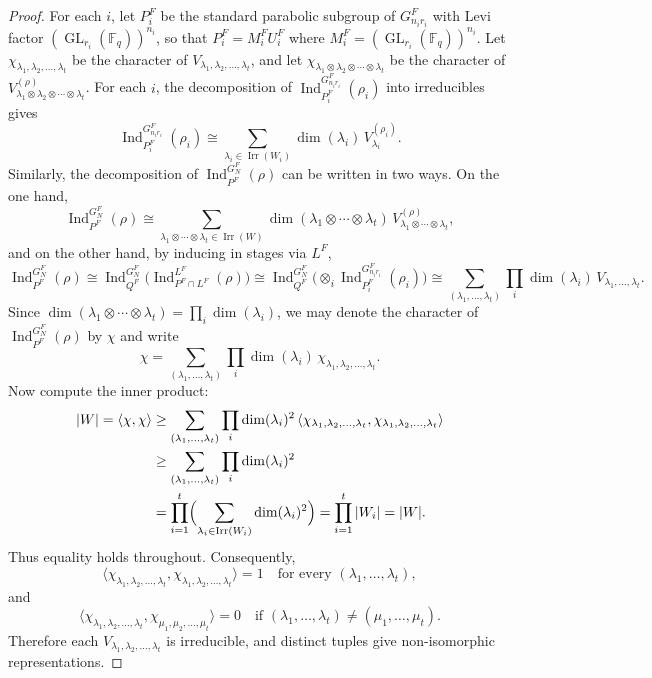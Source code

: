 \documentclass[12pt]{article}
\theoremstyle{remark}
\begin{document}
\begin{proof}
For each $i$, let $P_i^F$ be the standard parabolic subgroup of $G_{n_i r_i}^F$ with Levi factor $(\operatorname{GL}_{r_i}(\mathbb{F}_q))^{n_i}$, so that $P_i^F = M_i^F U_i^F$ where $M_i^F = (\operatorname{GL}_{r_i}(\mathbb{F}_q))^{n_i}$. Let $\chi_{\lambda_1,\lambda_2,\dots,\lambda_t}$ be the character of $V_{\lambda_1,\lambda_2,\dots,\lambda_t}$, and let $\chi_{\lambda_1 \otimes \lambda_2 \otimes \cdots \otimes \lambda_t}$ be the character of $V^{(\rho)}_{\lambda_1 \otimes \lambda_2 \otimes \cdots \otimes \lambda_t}$.
For each $i$, the decomposition of $\operatorname{Ind}_{P_i^F}^{G_{n_i r_i}^F}(\rho_i)$ into irreducibles gives
$$
\operatorname{Ind}_{P_i^F}^{G_{n_i r_i}^F}(\rho_i) \cong \sum_{\lambda_i \in \operatorname{Irr}(W_i)} \dim(\lambda_i) \, V_{\lambda_i}^{(\rho_i)}.
$$
Similarly, the decomposition of $\operatorname{Ind}_{P^F}^{G_N^F}(\rho)$ can be written in two ways. On the one hand,
$$
\operatorname{Ind}_{P^F}^{G_N^F}(\rho) \cong \sum_{\lambda_1 \otimes \cdots \otimes \lambda_t \in \operatorname{Irr}(W)} \dim(\lambda_1 \otimes \cdots \otimes \lambda_t) \, V^{(\rho)}_{\lambda_1 \otimes \cdots \otimes \lambda_t},
$$
and on the other hand, by inducing in stages via $L^F$,
$$
\operatorname{Ind}_{P^F}^{G_N^F}(\rho)
\cong \operatorname{Ind}_{Q^F}^{G_N^F}\bigl( \operatorname{Ind}_{P^F \cap L^F}^{L^F}(\rho) \bigr)
\cong \operatorname{Ind}_{Q^F}^{G_N^F}\bigl( \otimes_i \operatorname{Ind}_{P_i^F}^{G_{n_i r_i}^F}(\rho_i) \bigr)
\cong \sum_{(\lambda_1,\dots,\lambda_t)} \prod_i \dim(\lambda_i) \, V_{\lambda_1,\dots,\lambda_t}.
$$
Since $\dim(\lambda_1 \otimes \cdots \otimes \lambda_t) = \prod_i \dim(\lambda_i)$, we may denote the character of $\operatorname{Ind}_{P^F}^{G_N^F}(\rho)$ by $\chi$ and write
$$
\chi = \sum_{(\lambda_1,\dots,\lambda_t)} \prod_i \dim(\lambda_i) \, \chi_{\lambda_1,\lambda_2,\dots,\lambda_t}.
$$
Now compute the inner product:
\begin{align*}
|W| = \langle \chi,\chi \rangle
&\geq \sum_{(\lambda_1,\dots,\lambda_t)} \prod_i \dim(\lambda_i)^2 \,
\langle \chi_{\lambda_1,\lambda_2,\dots,\lambda_t},\chi_{\lambda_1,\lambda_2,\dots,\lambda_t} \rangle \\
&\geq \sum_{(\lambda_1,\dots,\lambda_t)} \prod_i \dim(\lambda_i)^2 \\
&= \prod_{i=1}^t \Bigl( \sum_{\lambda_i \in \operatorname{Irr}(W_i)} \dim(\lambda_i)^2 \Bigr)
= \prod_{i=1}^t |W_i| = |W|.
\end{align*}
Thus equality holds throughout. Consequently,
$$
\langle \chi_{\lambda_1,\lambda_2,\dots,\lambda_t},\chi_{\lambda_1,\lambda_2,\dots,\lambda_t} \rangle = 1
\quad\text{for every } (\lambda_1,\dots,\lambda_t),
$$
and
$$
\langle \chi_{\lambda_1,\lambda_2,\dots,\lambda_t},\chi_{\mu_1,\mu_2,\dots,\mu_t} \rangle = 0
\quad\text{if } (\lambda_1,\dots,\lambda_t) \neq (\mu_1,\dots,\mu_t).
$$
Therefore each $V_{\lambda_1,\lambda_2,\dots,\lambda_t}$ is irreducible, and distinct tuples give non-isomorphic representations.
\end{proof}
\end{document}
